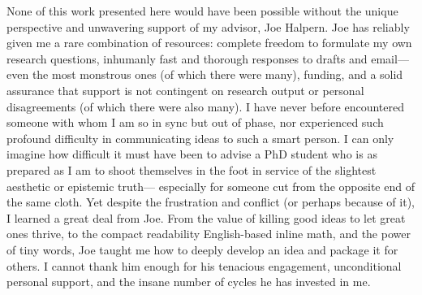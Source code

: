 %
%
None of this work presented here would have been possible without the unique perspective and unwavering support of my advisor, Joe Halpern. 
Joe has reliably given me a rare combination of resources:
complete freedom to formulate my own research questions,
inhumanly fast and thorough responses to drafts and email---even the most monstrous ones (of which there were many),
funding, and a solid assurance that support is not contingent on research output or personal disagreements (of which there were also many).
%
%
I have never before encountered someone with whom I am so in sync but out of phase, 
    nor experienced such profound difficulty in communicating ideas to such a smart person. 
%
I can only imagine how difficult it must have been
    to advise a PhD student
    who is as prepared as I am to shoot themselves in the foot
        in service of the slightest aesthetic or epistemic truth---%
    especially for someone cut from the opposite end of the same cloth.
%
Yet despite the frustration and conflict (or perhaps because of it), I learned a great deal from Joe. 
    From the value of killing good ideas to let great ones thrive, 
        to the compact readability English-based inline math, 
        and the power of tiny words,
    Joe taught me how to deeply develop an idea and package it for others.
I cannot thank him enough for his tenacious engagement, unconditional personal support, and the insane number of cycles he has invested in me. 

